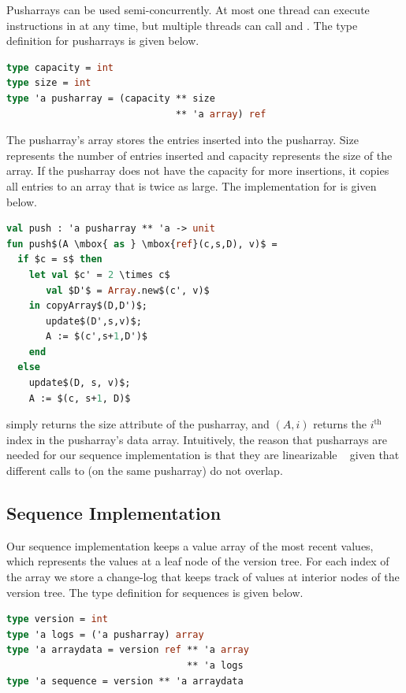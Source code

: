 Pusharrays can be used semi-concurrently. At most one thread can execute instructions in \push{} at any time, but multiple threads can call \size{} and \get{}. The type definition for pusharrays is given below.

\begin{lstlisting}[language=ML]
type capacity = int
type size = int
type 'a pusharray = (capacity ** size 
                              ** 'a array) ref
\end{lstlisting}

The pusharray's array stores the entries inserted into the pusharray. Size represents the number of entries inserted and capacity represents the size of the array. If the pusharray does not have the capacity for more insertions, it copies all entries to an array that is twice as large. The implementation for \push{} is given below.

\begin{lstlisting}[language=ML]
val push : 'a pusharray ** 'a -> unit
fun push$(A \mbox{ as } \mbox{ref}(c,s,D), v)$ =
  if $c = s$ then 
    let val $c' = 2 \times c$
       val $D'$ = Array.new$(c', v)$
    in copyArray$(D,D')$;
       update$(D',s,v)$;
       A := $(c',s+1,D')$
    end
  else 
    update$(D, s, v)$;
    A := $(c, s+1, D)$
\end{lstlisting}

\size{} simply returns the size attribute of the pusharray, and \get{}$(A,i)$ returns the $i^{\text{th}}$ index in the pusharray's data array. Intuitively, the reason that pusharrays are needed for our sequence implementation is that they are linearizable ~\cite{linearizability} given that different calls to \push{} (on the same pusharray) do not overlap.

\subsection{Sequence Implementation}
Our sequence implementation keeps a value array of the most recent values, which represents the values at a leaf node of the version tree. For each index of the array we store a change-log that keeps track of values at interior nodes of the version tree. The type definition for sequences is given below.

\begin{lstlisting}[language=ML]
type version = int
type 'a logs = ('a pusharray) array
type 'a arraydata = version ref ** 'a array 
                                ** 'a logs
type 'a sequence = version ** 'a arraydata
\end{lstlisting}

